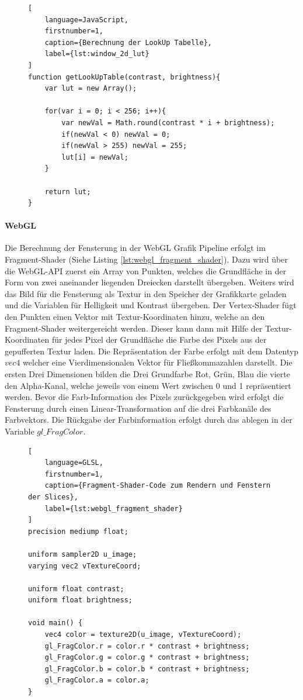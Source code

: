%
\begin{figure}[t]
\begin{lstlisting}[
	language=JavaScript,
	firstnumber=1,
	caption={Berechnung der LookUp Tabelle},
	label={lst:window_2d_lut}
]
function getLookUpTable(contrast, brightness){
    var lut = new Array();

    for(var i = 0; i < 256; i++){
        var newVal = Math.round(contrast * i + brightness);
        if(newVal < 0) newVal = 0;
        if(newVal > 255) newVal = 255;
        lut[i] = newVal;
    }

    return lut;
}
\end{lstlisting}
\end{figure}

\paragraph{WebGL}
Die Berechnung der Fensterung in der WebGL Grafik Pipeline erfolgt im Fragment-Shader (Siehe Listing \ref{lst:webgl_fragment_shader}).
Dazu wird über die WebGL-API zuerst ein Array von Punkten, 
welches die Grundfläche in der Form von zwei aneinander liegenden Dreiecken darstellt übergeben.
Weiters wird das Bild für die Fensterung als Textur in den Speicher der Grafikkarte geladen und die Variablen für Helligkeit und Kontrast übergeben.
Der Vertex-Shader fügt den Punkten einen Vektor mit Textur-Koordinaten hinzu, welche an den Fragment-Shader weitergereicht werden.
Dieser kann dann mit Hilfe der Textur-Koordinaten für jedes Pixel der Grundfläche die Farbe des Pixels aus der gepufferten Textur laden.
Die Repräsentation der Farbe erfolgt mit dem Datentyp $vec4$ welcher eine Vierdimensionalen Vektor für Fließkommazahlen darstellt.
Die ersten Drei Dimensionen bilden die Drei Grundfarbe Rot, Grün, Blau die vierte den Alpha-Kanal, welche jeweils von einem Wert zwischen 0 und 1 repräsentiert werden.
Bevor die Farb-Information des Pixels zurückgegeben wird erfolgt die Fensterung durch einen Linear-Transformation auf die drei Farbkanäle des Farbvektors.
Die Rückgabe der Farbinformation erfolgt durch das ablegen in der Variable $gl\_FragColor$.
\begin{figure}[t]
\begin{lstlisting}[
	language=GLSL,
	firstnumber=1,
	caption={Fragment-Shader-Code zum Rendern und Fenstern der Slices},
	label={lst:webgl_fragment_shader}
]
precision mediump float;

uniform sampler2D u_image;
varying vec2 vTextureCoord;

uniform float contrast;
uniform float brightness;

void main() {
    vec4 color = texture2D(u_image, vTextureCoord);
    gl_FragColor.r = color.r * contrast + brightness;
    gl_FragColor.g = color.g * contrast + brightness;
    gl_FragColor.b = color.b * contrast + brightness;
    gl_FragColor.a = color.a;
}
\end{lstlisting}
\end{figure}


